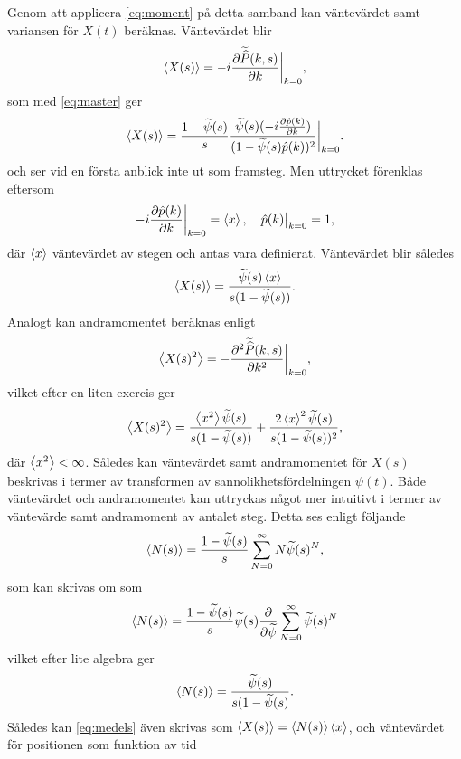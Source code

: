 Genom att applicera \eqref{eq:moment} på detta samband kan väntevärdet samt variansen för $X(t)$ beräknas. Väntevärdet blir 
\begin{equation}
\ev{X(s)} = -i\frac{\pd \Pks (k,s)}{\pd k}\bigg |_{k=0},
\end{equation}
som med \eqref{eq:master} ger 
\begin{equation}
\ev{X(s)} = \frac{1-\psis (s)}{s}\frac{\psis (s)(-i\frac{\pd \pk (k)}{\pd k})}{(1-\psis (s)\pk (k))^2}\bigg |_{k=0}.
\end{equation}
och ser vid en första anblick inte ut som framsteg. Men uttrycket förenklas eftersom
\begin{equation}
-i\frac{\pd \pk (k)}{\pd k}\bigg |_{k=0} = \ev{x}, \quad \pk (k)\big |_{k=0} = 1,
\end{equation}
där $\ev{x}$ väntevärdet av stegen och antas vara definierat.
Väntevärdet blir således 
\begin{equation}\label{eq:medels}
\ev{X(s)} = \frac{\psis (s)\ev{x}}{s(1-\psis (s))}.
\end{equation}
Analogt kan andramomentet beräknas enligt 
\begin{equation}
\ev{X(s)^2} = -\frac{\pd^2 \Pks (k,s)}{\pd k^2}\bigg |_{k=0},
\end{equation}
vilket efter en liten exercis ger
\begin{equation}\label{eq:vars}
\ev{X(s)^2} = \frac{\ev{x^2}\psis (s)}{s(1-\psis (s))}+\frac{2\ev{x}^2\psis (s)}{s(1-\psis (s))^2},
\end{equation}
där $\ev{x^2}< \infty$. Således kan väntevärdet samt andramomentet för $X(s)$ beskrivas i termer av transformen av sannolikhetsfördelningen $\psi(t)$. Både väntevärdet och andramomentet kan uttryckas något mer intuitivt i termer av väntevärde samt andramoment av antalet steg. Detta ses enligt följande 
\begin{equation}
   \ev{N(s)} = \frac{1-\psis (s)}{s}\sum_{N=0}^{\infty}N\psis (s)^N,
\end{equation}
som kan skrivas om som 
\begin{equation}
   \ev{N(s)} = \frac{1-\psis (s)}{s}\psis (s)\frac{\pd}{\pd \psis}\sum_{N=0}^{\infty}\psis (s)^N
\end{equation}
vilket efter lite algebra ger 
\begin{equation}
   \ev{N(s)} = \frac{\psis (s)}{s(1-\psis (s)}.
\end{equation}
Således kan \eqref{eq:medels} även skrivas som $\ev{X(s)}=\ev{N(s)}\ev{x}$, och väntevärdet för positionen som funktion av tid 
